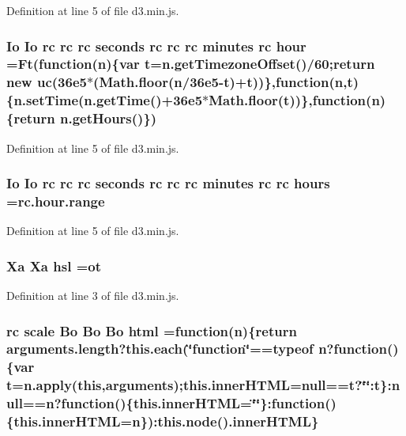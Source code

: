 Definition at line 5 of file d3.\+min.\+js.

\subsubsection[{hour}]{ {\bf Io} {\bf Io} {\bf rc} {\bf rc} {\bf rc} {\bf seconds} {\bf rc} {\bf rc} {\bf rc} {\bf minutes} {\bf rc} hour =Ft(function({\bf n})\{var t=n.\+get\+Timezone\+Offset()/60;{\bf return} new {\bf uc}(36e5$\ast$(\+Math.\+floor(n/36e5-\/t)+t))\},function(n,t)\{n.\+set\+Time(n.\+get\+Time()+36e5$\ast$\+Math.\+floor(t))\},function(n)\{return n.\+get\+Hours()\})}\label{d3_8min_8js_a3e98c98c0a667ad7098e7745798fb653}


Definition at line 5 of file d3.\+min.\+js.

\subsubsection[{hours}]{ {\bf Io} {\bf Io} {\bf rc} {\bf rc} {\bf rc} {\bf seconds} {\bf rc} {\bf rc} {\bf rc} {\bf minutes} {\bf rc} {\bf rc} hours ={\bf rc.\+hour.\+range}}\label{d3_8min_8js_a2390708314dd5d6fd674ff498b828306}


Definition at line 5 of file d3.\+min.\+js.

\subsubsection[{hsl}]{ {\bf Xa} {\bf Xa} hsl =ot}\label{d3_8min_8js_a47a2adffbc759f70a05fca29f0dcee25}


Definition at line 3 of file d3.\+min.\+js.

\subsubsection[{html}]{ {\bf rc} {\bf scale} {\bf Bo} {\bf Bo} {\bf Bo} html =function({\bf n})\{{\bf return} arguments.\+length?{\bf this.\+each}(\char`\"{}function\char`\"{}==typeof {\bf n}?function()\{var t=n.\+apply({\bf this},arguments);this.\+inner\+H\+T\+M\+L=null==t?\char`\"{}\char`\"{}\+:t\}\+:null=={\bf n}?function()\{this.\+inner\+H\+T\+M\+L=\char`\"{}\char`\"{}\}\+:function()\{this.\+inner\+H\+T\+M\+L={\bf n}\})\+:{\bf this.\+node}().inner\+H\+T\+M\+L\}}\label{d3_8min_8js_acae062b97a06bcc2f41ee463e4919e48}


